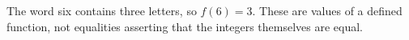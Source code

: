 The word six contains three letters, so $\boxed{f(6)=3}$. These are values of a defined function, not equalities asserting that the integers themselves are equal.
